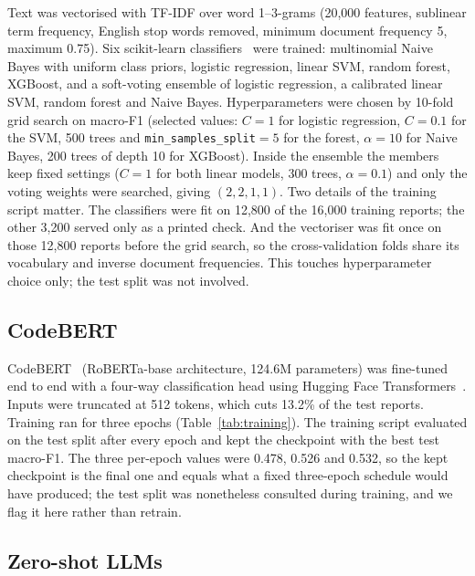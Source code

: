 \documentclass[a4paper,fleqn]{cas-sc}
\begin{document}
Text was vectorised with TF-IDF over word 1--3-grams (20,000 features, sublinear term
frequency, English stop words removed, minimum document frequency 5, maximum 0.75).
Six scikit-learn classifiers~\citep{pedregosa2011scikit} were trained: multinomial
Naive Bayes with uniform class priors, logistic regression, linear SVM, random forest,
XGBoost, and a soft-voting ensemble of logistic regression, a calibrated linear SVM,
random forest and Naive Bayes. Hyperparameters were chosen by 10-fold grid search on
macro-F1 (selected values: $C{=}1$ for logistic regression, $C{=}0.1$ for the SVM, 500
trees and \texttt{min\_samples\_split}${=}5$ for the forest, $\alpha{=}10$ for Naive
Bayes, 200 trees of depth 10 for XGBoost). Inside the ensemble the members keep fixed
settings ($C{=}1$ for both linear models, 300 trees, $\alpha{=}0.1$) and only the voting
weights were searched, giving $(2,2,1,1)$. Two details of the training
script matter. The classifiers were fit on 12,800 of the 16,000 training reports; the
other 3,200 served only as a printed check. And the vectoriser was fit once on those
12,800 reports before the grid search, so the cross-validation folds share its
vocabulary and inverse document frequencies. This touches hyperparameter choice only;
the test split was not involved.

\subsection{CodeBERT}

CodeBERT~\citep{feng2020codebert} (RoBERTa-base architecture, 124.6M parameters) was
fine-tuned end to end with a four-way classification head using Hugging Face
Transformers~\citep{wolf2020transformers}. Inputs were truncated at 512 tokens, which
cuts 13.2\% of the test reports. Training ran for three epochs (Table~\ref{tab:training}).
The training script evaluated on the test split after every epoch and kept the
checkpoint with the best test macro-F1. The three per-epoch values were 0.478, 0.526
and 0.532, so the kept checkpoint is the final one and equals what a fixed three-epoch
schedule would have produced; the test split was nonetheless consulted during
training, and we flag it here rather than retrain.

\subsection{Zero-shot LLMs}
\end{document}
